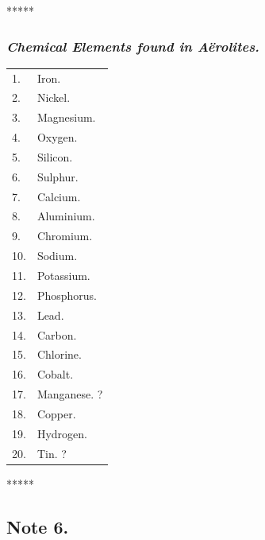 \documentclass[a4paper, 12pt, oneside]{article}
\begin{document}
\centerline{*\hspace{15mm}*\hspace{15mm}*\hspace{15mm}*\hspace{15mm}*}
\bigskip

\subsubsection{\emph{Chemical Elements found in Aërolites.}}
\begin{table}[H]
    \centering
    \bfseries
    \normalsize
    \Fontauri
    \begin{tabular}{l l}
        1. & Iron. \\
        2. & Nickel. \\
        3. & Magnesium. \\
        4. & Oxygen. \\
        5. & Silicon. \\
        6. & Sulphur. \\
        7. & Calcium. \\
        8. & Aluminium. \\
        9. & Chromium. \\
        10. & Sodium. \\
        11. & Potassium. \\
        12. & Phosphorus. \\
        13. & Lead. \\
        14. & Carbon. \\
        15. & Chlorine. \\
        16. & Cobalt. \\
        17. & Manganese. ? \\
        18. & Copper. \\
        19. & Hydrogen. \\
        20. & Tin. ? \\
    \end{tabular}
\end{table}

\centerline{*\hspace{15mm}*\hspace{15mm}*\hspace{15mm}*\hspace{15mm}*}
\bigskip

\subsection{Note 6.}
\end{document}
